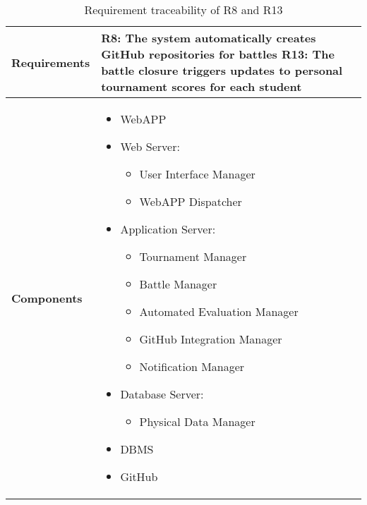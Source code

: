 \begin{table}[h!]
    \centering
    \begin{tabular}{|p{3cm}|p{12cm}|}    \hline
        \textbf{Requirements} & R8: The system automatically creates GitHub repositories for battles \newline R13: The battle closure triggers updates to personal tournament scores for each student \\
    \hline
        \textbf{Components} & 
            \begin{itemize}
                \item WebAPP
                \item Web Server:
                \begin{itemize}
                    \item User Interface Manager 
                    \item WebAPP Dispatcher
                \end{itemize}
                \item Application Server:
                \begin{itemize}
                    \item Tournament Manager
                    \item Battle Manager
                    \item Automated Evaluation Manager
                    \item GitHub Integration Manager
                    \item Notification Manager
                \end{itemize}
                \item Database Server:
                 \begin{itemize}
                    \item Physical Data Manager
                \end{itemize}
                \item DBMS
                \item GitHub
            \end{itemize}    \\
    \hline
    \end{tabular}
    \caption{Requirement traceability of R8 and R13}
    \label{tab:r8}
\end{table}

